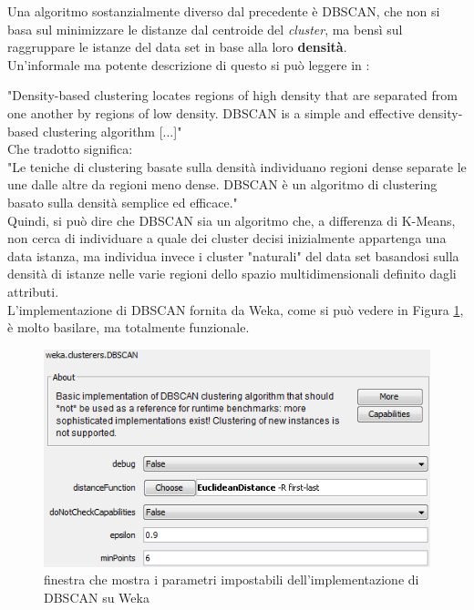         Una algoritmo sostanzialmente diverso dal precedente è DBSCAN, che non si basa sul minimizzare le distanze dal centroide del \textit{cluster}, ma bensì sul raggruppare le istanze del data set in base alla loro \textbf{densità}. \\

        Un'informale ma potente descrizione di questo si può leggere in \cite{dispense}:

        "Density-based clustering locates regions of high density that are separated from one another by regions of low density. DBSCAN is a simple and effective density-based clustering algorithm [...]"\\

        Che tradotto significa:\\

        "Le teniche di clustering basate sulla densità individuano regioni dense separate le une dalle altre da regioni meno dense. DBSCAN è un algoritmo di clustering basato sulla densità semplice ed efficace."\\

        Quindi, si può dire che DBSCAN sia un algoritmo che, a differenza di K-Means, non cerca di individuare a quale dei cluster decisi inizialmente appartenga una data istanza, ma individua invece i cluster "naturali" del data set basandosi sulla densità di istanze nelle varie regioni dello spazio multidimensionali definito dagli attributi. \\

        L'implementazione di DBSCAN fornita da Weka, come si può vedere in Figura \ref{dbscan_weka}, è molto basilare, ma totalmente funzionale.

        \begin{figure}
            \centering
            \caption{finestra che mostra i parametri impostabili dell'implementazione di DBSCAN su Weka}
            \label{dbscan_weka}
            \includegraphics[scale=0.70]{img/dbscan_weka.png}
        \end{figure}

